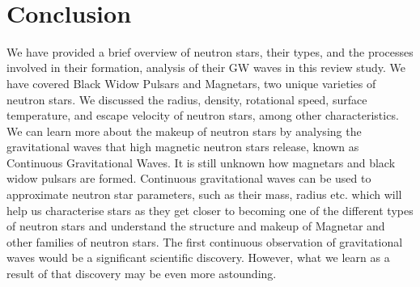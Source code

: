 \newpage\\
\section{Conclusion}

We have provided a brief overview of neutron stars, their types, and the processes involved in their formation, analysis of their GW waves in this review study. We have covered Black Widow Pulsars and Magnetars, two unique varieties of neutron stars. We discussed the radius, density, rotational speed, surface temperature, and escape velocity of neutron stars, among other characteristics. We can learn more about the makeup of neutron stars by analysing the gravitational waves that high magnetic neutron stars release, known as Continuous Gravitational Waves. It is still unknown how magnetars and black widow pulsars are formed. Continuous gravitational waves can be used to approximate neutron star parameters, such as their mass, radius etc. which will help us characterise stars as they get closer to becoming one of the different types of neutron stars and understand the structure and makeup of Magnetar and other families of neutron stars. The first continuous observation of gravitational waves would be a significant scientific discovery. However, what we learn as a result of that discovery may be even more astounding.